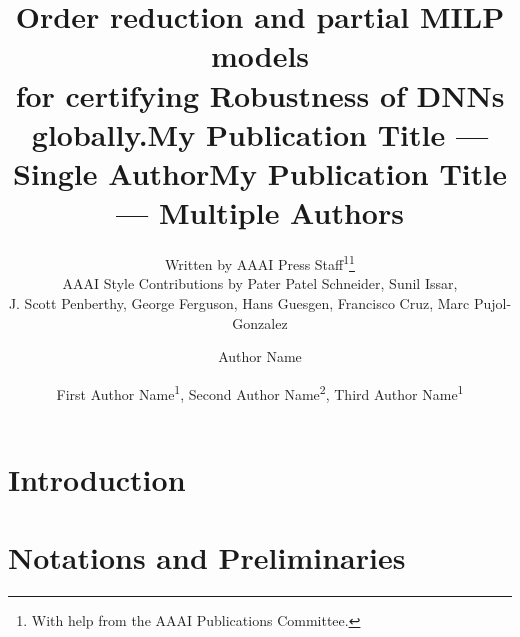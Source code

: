 \documentclass[letterpaper]{article} %
\title{Order reduction and partial MILP models \\
	for certifying Robustness of DNNs globally.}
\date{}
\author{
	Written by AAAI Press Staff\textsuperscript{\rm 1}\thanks{With help from the AAAI Publications Committee.}\\
	AAAI Style Contributions by Pater Patel Schneider,
	Sunil Issar,\\
	J. Scott Penberthy,
	George Ferguson,
	Hans Guesgen,
	Francisco Cruz\equalcontrib,
	Marc Pujol-Gonzalez\equalcontrib
}
\title{My Publication Title --- Single Author}
\author {
	Author Name
}
\title{My Publication Title --- Multiple Authors}
\author {
	First Author Name\textsuperscript{\rm 1},
	Second Author Name\textsuperscript{\rm 2},
	Third Author Name\textsuperscript{\rm 1}
}
\begin{document}
	
	\maketitle
	
	\begin{abstract}
		
		\iffalse
		Most DNNs are brittle to small perturbations. Extensive works have thus been performed to verify robustness for DNNs.
		However, these works mostly consider local robustness, i.e. in the neighborhood of an image.
		While local robustness is useful to have an idea how often non robust images happen, by repeating the verification on 1000 or 10000 pre-obtained images, the main shortcoming is that we have no guarantee that a specific new incoming image, e.g. in a video feed, is robust: The verification process takes too long and requires too much resources to be performed online on embedded systems.
		
		In this paper, we consider {\em global} robustness, that is, guarantees not restricted to a set of local images. For that, we consider {\em bounds} on the switch of values between the different decision classes of a DNN due to a given perturbation. 
		The verification question is much harder than local robustness, as the number of complex variables doubles (from the deviation image to the image and its deviation).
		Further, the values each neuron can take is no more in a small neighborhood.
		Therefore, the global verification process is very complex.
		To obtain useable bounds, we develop several novel partial MILP models for global robustness, with different trade-offs. Last, we use order reduction techniques to reduce the space of images considered, avoiding unrealistic inputs, by using linear PCA. 
		This results into usable bounds, allowing in real time to certify robustness for $87\%$ of incoming images in the MNIST benchmark for a L1-perturbation of $0.5$, as well as for a surrogate computing the hidden plastic strain associated to a deformation map of a pipe.
		\fi
	\end{abstract}
	
	
	\section{Introduction}
	
	
	
	\section{Notations and Preliminaries}
	
\end{document}
